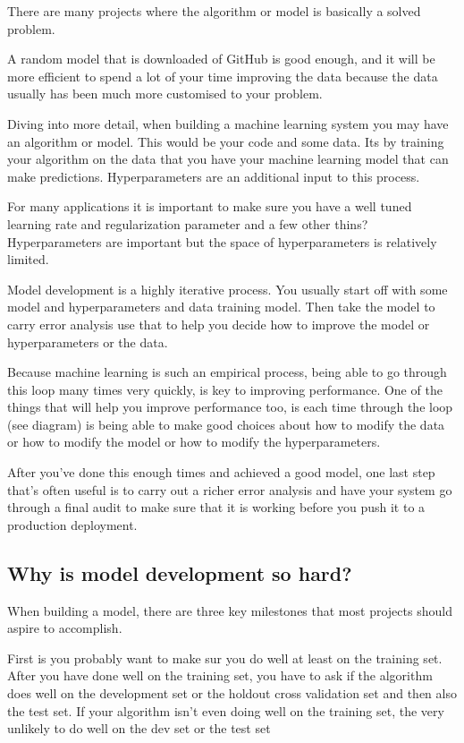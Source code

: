 There are many projects where the algorithm or model is basically a solved problem.

A random model that is downloaded of GitHub is good enough, and it will be more efficient to spend a lot of your time improving the data because the data usually has been much more customised to your problem.

Diving into more detail, when building a machine learning system you may have an algorithm or model.
This would be your code and some data.
Its by training your algorithm on the data that you have your machine learning model that can make predictions.
Hyperparameters are an additional input to this process.

For many applications it is important to make sure you have a well tuned learning rate and regularization parameter and a few other thins?
Hyperparameters are important but the space of hyperparameters is relatively limited.

Model development is a highly iterative process.
You usually start off with some model and hyperparameters and data training model.
Then take the model to carry error analysis use that to help you decide how to improve the model or hyperparameters or the data.

Because machine learning is such an empirical process, being able to go through this loop many times very quickly, is key to improving performance.
One of the things that will help you improve performance too, is each time through the loop (see diagram) is being able to make good choices about how to modify the data or how to modify the model or how to modify the hyperparameters.

After you've done this enough times and achieved a good model, one last step that's often useful is to carry out a richer error analysis and have your system go through a final audit to make sure that it is working before you push it to a production deployment.

\subsection{Why is model development so hard?}

When building a model, there are three key milestones that most projects should aspire to accomplish.

First is you probably want to make sur you do well at least on the training set.
After you have done well on the training set, you have to ask if the algorithm does well on the development set or the holdout cross validation set and then also the test set.
If your algorithm isn't even doing well on the training set, the very unlikely to do well on the dev set or the test set

